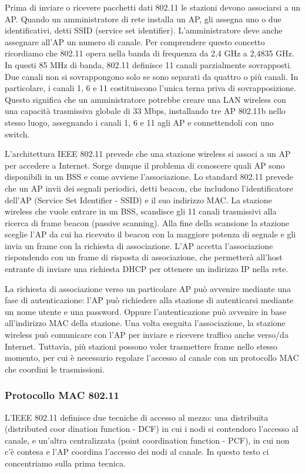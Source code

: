 Prima di inviare o ricevere pacchetti dati 802.11 le stazioni devono associarsi a un AP. Quando un amministratore di rete installa un AP, gli assegna uno o due identificativi, detti SSID (service set identifier). L’amministratore deve anche assegnare all’AP un numero di canale. Per comprendere questo concetto ricordiamo che 802.11 opera nella banda di frequenza da 2,4 GHz a 2,4835 GHz. In questi 85 MHz di banda, 802.11 definisce 11 canali parzialmente sovrapposti. Due canali non si sovrappongono solo se sono separati da quattro o più canali. In particolare, i canali 1, 6 e 11 costituiscono l’unica terna priva di sovrapposizione. Questo significa che un amministratore potrebbe creare una LAN wireless con una capacità trasmissiva globale di 33 Mbps, installando tre AP 802.11b nello stesso luogo, assegnando i canali 1, 6 e 11 agli AP e connettendoli con uno switch.

L'architettura IEEE 802.11 prevede che una stazione wireless si associ a un AP per accedere a Internet. Sorge dunque il problema di conoscere quali AP sono disponibili in un BSS e come avviene l'associazione. Lo standard 802.11 prevede che un AP invii dei segnali periodici, detti beacon, che includono l'identificatore dell'AP (Service Set Identifier - SSID) e il suo indirizzo MAC. La stazione wireless che vuole entrare in un BSS, scandisce gli 11 canali trasmissivi alla ricerca di frame beacon (passive scanning). Alla fine della scansione la stazione sceglie l'AP da cui ha ricevuto il beacon con la maggiore potenza di segnale e gli invia un frame con la richiesta di associazione. L'AP accetta l'associazione rispondendo con un frame di risposta di associazione, che permetterà all'host entrante di inviare una richiesta DHCP per ottenere un indirizzo IP nella rete.

La richiesta di associazione verso un particolare AP può avvenire mediante una fase di autenticazione: l'AP può richiedere alla stazione di autenticarsi mediante un nome utente e una password. Oppure l'autenticazione può avvenire in base all'indirizzo MAC della stazione. Una volta eseguita l'associazione, la stazione wireless può comunicare con l'AP per inviare e ricevere traffico anche verso/da Internet. Tuttavia, più stazioni possono voler trasmettere frame nello stesso momento, per cui è necessario regolare l'accesso al canale con un protocollo MAC che coordini le trasmissioni.

\subsubsection{Protocollo MAC 802.11}
L'IEEE 802.11 definisce due tecniche di accesso al mezzo: una distribuita (distributed coor dination function - DCF) in cui i nodi si contendoro l'accesso al canale, e un'altra centralizzata (point coordination function - PCF), in cui non c'è contesa e l'AP coordina l'accesso dei nodi al canale. In questo testo ci concentriamo sulla prima tecnica.

